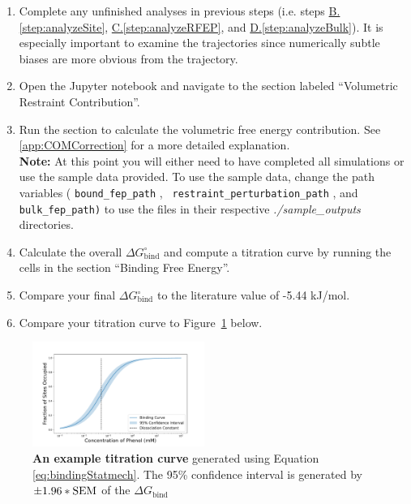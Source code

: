 \documentclass[9pt,tutorial]{Styling/livecoms}
\newcommand{\filepath}[1]{\textit{#1}}
\newcommand{\textInput}[1]{
  \texttt{#1}
}
\begin{document}
    \begin{enumerate}
    \item Complete any unfinished analyses in previous steps (i.e. steps \hyperref[step:analyzeSite]{B.\ref{step:analyzeSite}}, \hyperref[step:analyzeRFEP]{C.\ref{step:analyzeRFEP}}, and \hyperref[step:analyzeBulk]{D.\ref{step:analyzeBulk}}).
    It is especially important to examine the trajectories since numerically subtle biases are more obvious from the trajectory.
    \item Open the Jupyter notebook and navigate to the section labeled ``Volumetric Restraint Contribution''.
    \item Run the section to calculate the volumetric free energy contribution.\label{step:dGV}
    See \ref{app:COMCorrection} for a more detailed explanation.\\
    \textbf{Note:} At this point you will either need to have completed all simulations or use the sample data provided. To use the sample data, change the path variables (\textInput{bound\_fep\_path},\textInput{ restraint\_perturbation\_path}, and \textInput{bulk\_fep\_path\textrm{)}} to use the files in their respective \filepath{./sample\_outputs} directories. 
    \item Calculate the overall $\Delta G_\mathrm{bind}^\circ$ and compute a titration curve by running the cells in the section ``Binding Free Energy''.
    \item Compare your final $\Delta G_\mathrm{bind}^\circ$ to the literature value of -5.44 kJ/mol\cite{Merski2013}.
    \item Compare your titration curve to Figure~\ref{fig:titrationCurve} below.
\end{enumerate}
\begin{figure}[!htb]
    \centering
    \includegraphics[width=0.5\textwidth]{titration_curve}
    \caption{\textbf{An example titration curve} generated using Equation \ref{eq:bindingStatmech}. The 95\% confidence interval is generated by $\pm 1.96*\rm SEM$ of the $\Delta G_\mathrm{bind}$}
    \label{fig:titrationCurve}  
\end{figure}
\end{document}
